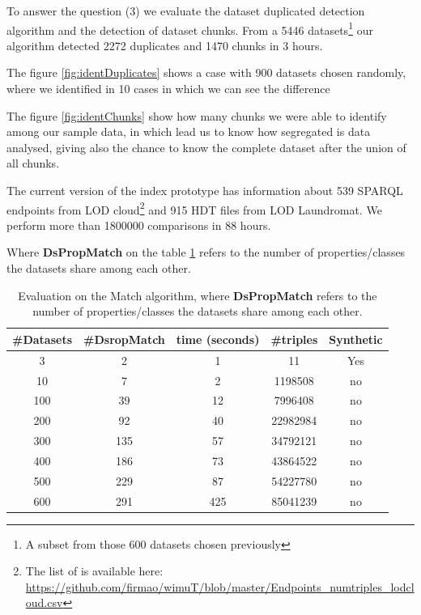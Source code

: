 
To answer the question (3) we evaluate the dataset duplicated detection algorithm and the detection of dataset chunks.
From a 5446 datasets\footnote{A subset from those 600 datasets chosen previously} our algorithm detected 2272 duplicates and 1470 chunks in 3 hours.

The figure \ref{fig:identDuplicates} shows a case with 900 datasets chosen randomly, where we identified in 10 cases in which we can see the difference 

The figure \ref{fig:identChunks} show how many chunks we were able to identify among our sample data, in which lead us to know how segregated is data analysed, giving also the chance to know the complete dataset after the union of all chunks.

The current version of the index prototype has information about 539 SPARQL endpoints from LOD cloud\footnote{The list of is available here: \url{https://github.com/firmao/wimuT/blob/master/Endpoints_numtriples_lodcloud.csv}} and 915 HDT files from LOD Laundromat. We perform more than \num{1800000} comparisons in 88 hours.

Where \textbf{DsPropMatch} on the table \ref{tab:match} refers to the number of properties/classes the datasets share among each other.

\begin{table}[htb]
    \centering
    \begin{tabular}{ccccc} \hline
    \textbf{\#Datasets} & \textbf{\#DsropMatch} & \textbf{time (seconds)} & \textbf{\#triples} & \textbf{Synthetic} \\ \hline
    3 & 2 & 1 & 11 & Yes \\
    10 & 7 & 2 & 1198508 & no \\
    100 & 39 & 12 & 7996408 & no \\
    200 & 92 & 40 & 22982984 & no \\
    300 & 135 & 57 & 34792121 & no \\
    400 & 186 & 73 & 43864522 & no \\
    500 & 229 & 87 & 54227780 & no \\
    600 & 291 & 425 & 85041239 & no \\ \hline
    \end{tabular}
    \caption{Evaluation on the Match algorithm, where \textbf{DsPropMatch} refers to the number of properties/classes the datasets share among each other.}
    \label{tab:match}
\end{table}

